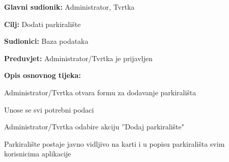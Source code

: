 \noindent {}
\begin{packed_item}

	\item \textbf{Glavni sudionik:} Administrator, Tvrtka
	\item  \textbf{Cilj:} Dodati parkiralište
	\item  \textbf{Sudionici:} Baza podataka
	\item  \textbf{Preduvjet:} Administrator/Tvrtka je prijavljen
	\item  \textbf{Opis osnovnog tijeka:}
	
	\item[] \begin{packed_enum}
		
		\item Administrator/Tvrtka otvara formu za dodavanje parkirališta
		\item Unose se svi potrebni podaci
		\item Administrator/Tvrtka odabire akciju ”Dodaj parkiralište"
		\item Parkiralište postaje javno vidljivo na karti i u popisu parkirališta svim korisnicima aplikacije

	\end{packed_enum}
\end{packed_item}

